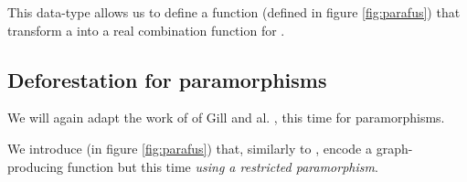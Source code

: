 This data-type allows us to define a function  (defined in figure \ref{fig:parafus}) that transform a  into a real combination function for .

\subsection{Deforestation for paramorphisms}
\label{sec:defor-para}

We will again adapt the work of of Gill and al. \cite{Gill:1993:SCD:165180.165214}, this time for paramorphisms.

We introduce  (in figure \ref{fig:parafus}) that, similarly to , encode a graph-producing function but this time \emph{using a restricted paramorphism}.



